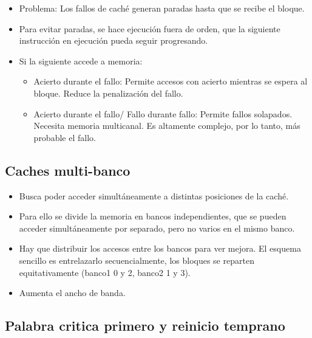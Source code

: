 \documentclass[12pt, twoside, openright]{report} %
\begin{document}
\begin{itemize}

	\item Problema: Los fallos de caché generan paradas hasta que se recibe
	      el bloque.
	\item Para evitar paradas, se hace ejecución fuera de orden, que la
	      siguiente instrucción en ejecución pueda seguir progresando.
	\item Si la siguiente accede a memoria:

	      \begin{itemize}

		      \item Acierto durante el fallo: Permite accesos con acierto mientras
		            se espera al bloque. Reduce la penalización del fallo.
		      \item Acierto durante el fallo/ Fallo durante fallo: Permite fallos
		            solapados. Necesita memoria multicanal. Es altamente complejo,
		            por lo tanto, más probable el fallo.
	      \end{itemize}
\end{itemize}
\subsection{Caches multi-banco}

\begin{itemize}

	\item Busca poder acceder simultáneamente a distintas posiciones de la
	      caché.
	\item Para ello se divide la memoria en bancos independientes, que se
	      pueden acceder simultáneamente por separado, pero no varios en el
	      mismo banco.
	\item Hay que distribuir los accesos entre los bancos para ver mejora.
	      El esquema sencillo es entrelazarlo secuencialmente, los bloques
	      se reparten equitativamente (banco1 0 y 2, banco2 1 y 3).
	\item Aumenta el ancho de banda.
\end{itemize}
\subsection{Palabra critica primero y reinicio temprano}
\end{document}
